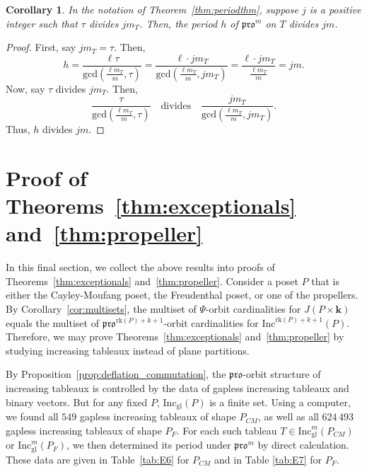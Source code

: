 \documentclass[12pt]{amsart}
\newtheorem{corollary}[theorem]{Corollary}
\theoremstyle{definition}
\theoremstyle{remark}
\numberwithin{equation}{section}
\newcommand{\inc}{\ensuremath{\mathrm{Inc}}}
\newcommand{\incgl}{\inc_{\mathrm{gl}}}
\newcommand{\pro}{\mathfrak{pro}}
\newcommand{\rank}{\ensuremath{\mathrm{rk}}}
\begin{document}
\begin{corollary}\label{corr:pdbound}
In the notation of Theorem~\ref{thm:periodthm}, suppose $j$ is a positive integer such that $\tau$ divides $j m_T$. Then, the period $h$ of $\pro^m$ on $T$ divides $j m$. 
\end{corollary} 
\begin{proof}
First, say $j m_T = \tau$. Then,
\begin{equation}\label{eq:pdbound} h=  \frac{\ell \tau}{\text{gcd}(\frac{\ell m_T}{m},\tau)} = \frac{\ell \cdot j m_T}{\text{gcd}(\frac{\ell m_T}{m},j m_T)} = \frac{\ell \cdot j m_T}{\frac{\ell m_T}{m}} = jm. 
\end{equation}
Now, say $\tau$ divides $jm_T$. Then, \[ \frac{\tau}{\text{gcd}(\frac{\ell m_T}{m},\tau)} \ \ \  \text{    divides   } \ \ \ \frac{j m_T}{\text{gcd}(\frac{\ell m_T}{m},j m_T)}.\] Thus, $h$ divides $j m$. 
\end{proof}

\section{Proof of Theorems~\ref{thm:exceptionals} and~\ref{thm:propeller}}\label{sec:arithmetic}

In this final section, we collect the above results into proofs of Theorems~\ref{thm:exceptionals} and~\ref{thm:propeller}. Consider a poset $P$ that is either the Cayley-Moufang poset, the Freudenthal poset, or one of the propellers. By Corollary~\ref{cor:multisets},  the multiset of $\Psi$-orbit cardinalities for $J(P \times \mathbf{k})$ equals the multiset of $\pro^{\rank(P)+ k+1}$-orbit cardinalities for $\inc^{ \rank(P)+ k+1}(P)$. Therefore, we may prove Theorems~\ref{thm:exceptionals} and~\ref{thm:propeller} by studying increasing tableaux instead of plane partitions. 

By Proposition~\ref{prop:deflation_commutation}, the $\pro$-orbit structure of increasing tableaux is controlled by the data of gapless increasing tableaux and binary vectors. But for any fixed $P$, $\incgl(P)$ is a finite set. Using a computer, we found all $549$ gapless increasing tableaux of shape $P_{CM}$, as well as all $624\, 493$ gapless increasing tableaux of shape $P_F$. For each such tableau $T \in \incgl^m(P_{CM})$ or $\incgl^m(P_F)$, we then determined its period under $\pro^m$ by direct calculation. These data are given in Table~\ref{tab:E6} for $P_{CM}$ and in Table \ref{tab:E7} for $P_F$. 
\end{document}
